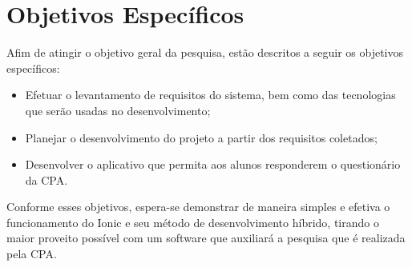 \section{Objetivos Específicos}

	\par Afim de atingir o objetivo geral da pesquisa, estão descritos a seguir os objetivos específicos:
	
	\begin{itemize}
		\item Efetuar o levantamento de requisitos do sistema, bem como das tecnologias que serão usadas no desenvolvimento;
		\item Planejar o desenvolvimento do projeto a partir dos requisitos coletados;
		\item Desenvolver o aplicativo que permita aos alunos responderem o questionário da CPA.
	\end{itemize}
	\par Conforme esses objetivos, espera-se demonstrar de maneira simples e efetiva o funcionamento do Ionic e seu método de desenvolvimento híbrido, tirando o maior proveito possível com um software que auxiliará a pesquisa que é realizada pela CPA.

